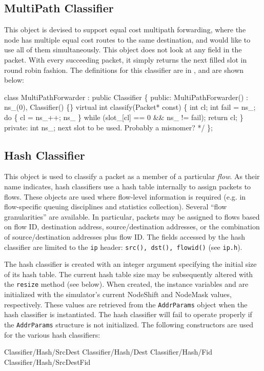 \subsection{MultiPath Classifier}
\label{sec:node:mpath-classifier}

This object is devised to support equal cost multipath
forwarding, where the node has multiple equal cost routes
to the same destination, and would like to use all of them
simultaneously.
This object does not look at any field in the packet.
With every succeeding packet, 
it simply returns the next filled slot in round robin fashion.
The definitions for this classifier are in ,
and are shown below:
\begin{program}
class MultiPathForwarder : public Classifier \{
public:
        MultiPathForwarder() : ns_(0), Classifier() \{\} 
        virtual int classify(Packet* const) \{
                int cl;
                int fail = ns_;
                do \{
                        cl = ns_++;
                        ns_ %
                \} while (slot_[cl] == 0 && ns_ != fail);
                return cl;
        \}
private:
        int ns_;     \* next slot to be used.  Probably a misnomer? */
\};
\end{program}

\subsection{Hash Classifier}
\label{sec:node:hash-classifier}

This object is used to classify a packet as a member of a
particular {\em flow}.
As their name indicates,
hash classifiers use a hash table internally to assign
packets to flows.
These objects are used where flow-level information is
required (e.g. in flow-specific queuing disciplines and statistics
collection).
Several ``flow granularities'' are available.  In particular,
packets may be assigned to flows based on flow ID, destination address,
source/destination addresses, or the combination of source/destination
addresses plus flow ID.
The fields accessed by the hash classifier are limited to
the {\tt ip} header: {\tt src(), dst(), flowid()} (see {\tt ip.h}).

The hash classifier is created with an integer argument specifying
the initial size of its hash table.  The current hash table size may
be subsequently altered with the {\tt resize} method (see below).
When created, the instance variables  and 
are initialized with the simulator's current {\sf NodeShift} and
{\sf NodeMask} values, respectively.  These values are retrieved
from the {\tt AddrParams} object when the hash classifier is
instantiated.  The hash classifier will fail to operate properly if
the {\tt AddrParams} structure is not initialized.
The following constructors are used for the various hash classifiers:
\begin{program}
        Classifier/Hash/SrcDest
        Classifier/Hash/Dest
        Classifier/Hash/Fid
        Classifier/Hash/SrcDestFid
\end{program}

